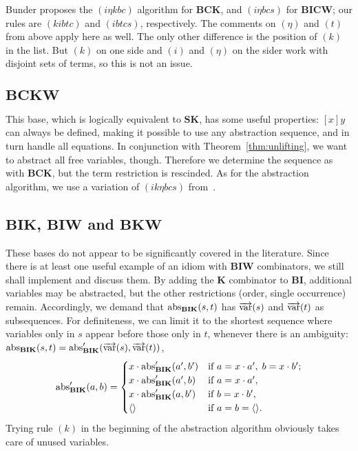 Bunder proposes the $(i\eta kbc)$ algorithm for $\mathbf{BCK}$, and
$(i\eta bcs)$ for $\mathbf{BICW}$; our rules are $(kibtc)$ and $(ibtcs)$,
respectively.
The comments on $(\eta)$ and $(t)$ from above apply here as well.
The only other difference is the position of $(k)$ in the list.
But $(k)$ on one side and $(i)$ and $(\eta)$ on the sider work with disjoint
sets of terms, so this is not an issue.

\subsection*{$\mathbf{BCKW}$}\label{subsec:base-bckw}

This base, which is logically equivalent to $\mathbf{SK}$, has some useful
properties:
$[x]y$ can always be defined, making it possible to use any abstraction
sequence, and in turn handle all equations.
In conjunction with Theorem~\ref{thm:unlifting}, we want to abstract all
free variables, though.
Therefore we determine the sequence as with $\mathbf{BCK}$, but the
term restriction is rescinded.
As for the abstraction algorithm, we use a variation of $(ik\eta bcs)$
from~\cite{curry68}.

\subsection*{$\mathbf{BIK}$, $\mathbf{BIW}$ and $\mathbf{BKW}$}\label{subsec:base-odd}

These bases do not appear to be significantly covered in the literature.
Since there is at least one useful example of an idiom with $\mathbf{BIW}$
combinators, we still shall implement and discuss them.
By adding the $\mathbf{K}$ combinator to $\mathbf{BI}$, additional variables
may be abstracted, but the other restrictions (order, single occurrence) remain.
Accordingly, we demand that $\operatorname{abs}_\mathbf{BIK}(s,t)$ has $\overrightarrow{\operatorname{var}}(s)$ and
$\overrightarrow{\operatorname{var}}(t)$ as subsequences.
For definiteness, we can limit it to the shortest sequence where variables
only in $s$ appear before those only in $t$, whenever there is an ambiguity:
$\operatorname{abs}_\mathbf{BIK}(s,t) = \operatorname{abs}'_\mathbf{BIK}(\overrightarrow{\operatorname{var}}(s), \overrightarrow{\operatorname{var}}(t))$,
\[ \operatorname{abs}'_\mathbf{BIK}(a,b) = \begin{cases}
		x \cdot \operatorname{abs}'_\mathbf{BIK}(a',b') &\text{if } a = x \cdot a', \; b = x \cdot b'; \\
		x \cdot \operatorname{abs}'_\mathbf{BIK}(a',b) &\text{if } a = x \cdot a', \\
		x \cdot \operatorname{abs}'_\mathbf{BIK}(a,b') &\text{if } b = x \cdot b', \\
		\langle \rangle &\text{if } a = b = \langle \rangle. \end{cases} \]
Trying rule $(k)$ in the beginning of the abstraction algorithm obviously takes
care of unused variables.

